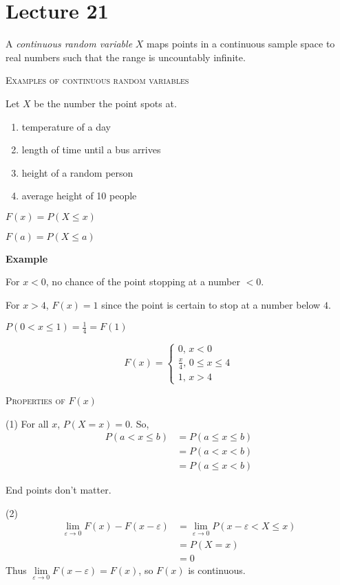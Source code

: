 \section{Lecture 21}
A \emph{continuous random variable} $ X $ maps points in a continuous
sample space to real numbers such that the range is uncountably infinite.

\textsc{Examples of continuous random variables}

Let $ X $ be the number the point spots at.
\begin{enumerate}[(1)]
    \item temperature of a day
    \item length of time until a bus arrives
    \item height of a random person
    \item average height of 10 people
\end{enumerate}

$F(x)=P(X\le x)$

$F(a)=P(X\le a) $

\textbf{Example}

For $ x<0 $, no chance of the point stopping at a number $ <0 $.

For $ x>4 $, $ F(x)=1 $ since the point is certain to stop at a number
below $ 4 $.

$ P(0<x\le 1)=\frac{1}{4}=F(1) $

\[ F(x)=\begin{cases}
    0,\, x<0\\
    \frac{x}{4},\,0\le x\le 4 \\
    1,\,x>4
\end{cases} \]

\textsc{Properties of $ F(x) $}

(1) For all $ x $, $ P(X=x)=0 $. So,
\begin{align*}
    P(a<x\le b)&=P(a\le x\le b)\\
    &=P(a<x<b)\\
    &=P(a\le x<b)
\end{align*}
\begin{remark}
    End points don't matter.
\end{remark}

(2) \begin{align*}
    \lim\limits_{{\varepsilon} \to {0}} F(x)-F(x-\varepsilon)&=
    \lim\limits_{{\varepsilon} \to {0}} P(x-\varepsilon<X\le x)\\
    &=P(X=x)\\
    &=0
\end{align*}
Thus $ \lim\limits_{{\varepsilon} \to {0}} F(x-\varepsilon)=F(x) $, so
$ F(x) $ is continuous.

